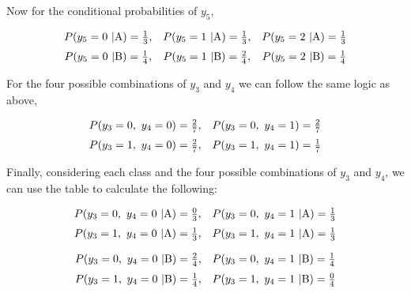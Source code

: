 \documentclass[12pt]{article}
\begin{document}
\begin{enumerate}[leftmargin=\labelsep]
\begin{enumerate}
                Now for the conditional probabilities of $y_5$,

                \[
                  \begin{array}{ccc}
                    P(y_5 = 0 \ | \text{A}) = \frac{1}{3}, &
                    P(y_5 = 1 \ | \text{A}) = \frac{1}{3}, &
                    P(y_5 = 2 \ | \text{A}) = \frac{1}{3}    \\[\medskipamount]
                    P(y_5 = 0 \ | \text{B}) = \frac{1}{4}, &
                    P(y_5 = 1 \ | \text{B}) = \frac{2}{4}, &
                    P(y_5 = 2 \ | \text{B}) = \frac{1}{4}
                  \end{array}
                \]

                For the four possible combinations of $y_3$ and $y_4$ we can follow
                the same logic as above,

                \[
                  \begin{array}{cc}
                    P(y_3 = 0, \ y_4 = 0) = \frac{2}{7}, &
                    P(y_3 = 0, \ y_4 = 1) = \frac{2}{7}    \\[\medskipamount]
                    P(y_3 = 1, \ y_4 = 0) = \frac{2}{7}, &
                    P(y_3 = 1, \ y_4 = 1) = \frac{1}{7}
                  \end{array}
                \]

                Finally, considering each class and the four possible combinations
                of $y_3$ and $y_4$, we can use the table to calculate the following:

                \[
                  \begin{array}{cc}
                    P(y_3 = 0, \ y_4 = 0 \ | \text{A}) = \frac{0}{3}, &
                    P(y_3 = 0, \ y_4 = 1 \ | \text{A}) = \frac{1}{3}    \\[\medskipamount]
                    P(y_3 = 1, \ y_4 = 0 \ | \text{A}) = \frac{1}{3}, &
                    P(y_3 = 1, \ y_4 = 1 \ | \text{A}) = \frac{1}{3}
                  \end{array}
                \]

                \[
                  \begin{array}{cc}
                    P(y_3 = 0, \ y_4 = 0 \ | \text{B}) = \frac{2}{4}, &
                    P(y_3 = 0, \ y_4 = 1 \ | \text{B}) = \frac{1}{4}    \\[\medskipamount]
                    P(y_3 = 1, \ y_4 = 0 \ | \text{B}) = \frac{1}{4}, &
                    P(y_3 = 1, \ y_4 = 1 \ | \text{B}) = \frac{0}{4}
                  \end{array}
                \]


\end{enumerate}
\end{enumerate}
\end{document}
